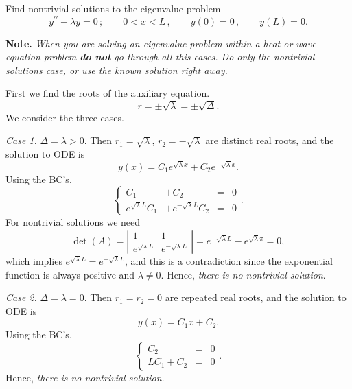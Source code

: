 \documentclass[11pt]{article}
\begin{document}
\begin{problem}
Find nontrivial solutions to the eigenvalue problem
\begin{equation*}
y^{\prime \prime} - \lambda y =0\,; \qquad  0<x<L \,, \qquad y(0)=0  \,,\qquad y(L) =0. 
\end{equation*}
\end{problem}

\begin{solution}
\textbf{Note.} \textsl{When you are solving an eigenvalue problem within a heat or wave equation problem \textbf{do not} go through all this cases. Do only the nontrivial solutions case, or use the known solution right away.}

First we find the roots of the auxiliary equation.
\[r=\pm\sqrt{\lambda}=\pm\sqrt{\Delta}.\]
We consider the three cases.\\

\par \textsl{Case 1.} $\Delta = \lambda >0.$ Then $r_{1}=\sqrt{\lambda}$, $r_{2}=-\sqrt{\lambda}$ are distinct real roots, and the solution to ODE is
\[y(x)=C_{1}e^{\sqrt{\lambda}x}+C_{2}e^{-\sqrt{\lambda}x}.\]
Using the BC's,
\begin{equation*}
\left\{\begin{array}{rrcc}
       C_{1} &+C_{2}&=&0\\
       e^{\sqrt{\lambda}L}C_{1} &+ e^{-\sqrt{\lambda}L}C_{2}&=&0
      \end{array}\right. .
\end{equation*}
For nontrivial solutions we need 
$$\det(A)=\left|\begin{matrix}1&1 \\ e^{\sqrt{\lambda}L} & e^{-\sqrt{\lambda}L}\end{matrix}\right|=e^{-\sqrt{\lambda}L}-e^{\sqrt{\lambda}\pi}=0,$$ 
which implies $e^{\sqrt{\lambda}L}=e^{-\sqrt{\lambda}L}$, and this is a contradiction since the exponential function is always positive and $\lambda\neq 0$. Hence, \textsl{there is no nontrivial solution}.

\par \textsl{Case 2.} $\Delta = \lambda =0.$ Then $r_{1}=r_{2}=0$ are repeated real roots, and the solution to ODE is
\[y(x)=C_{1}x+C_{2}.\]
Using the BC's,
\begin{equation*}
\left\{\begin{array}{rcc}
       C_{2} & = &0\\
       LC_{1} + C_{2} & = &0
      \end{array}\right. .
\end{equation*}
Hence, \textsl{there is no nontrivial solution}.


\end{solution}
\end{document}
